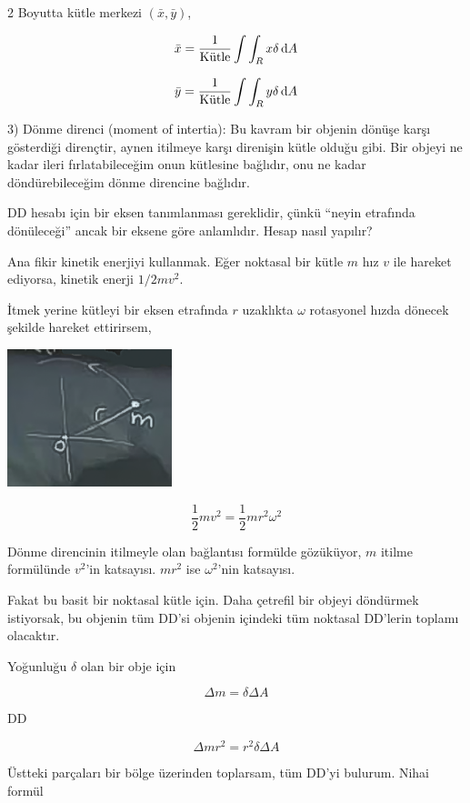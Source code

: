 \documentclass[12pt,fleqn]{article}\usepackage{../../common}
\begin{document}
2 Boyutta kütle merkezi $(\bar{x},\bar{y})$, 

$$  \bar{x}  = \frac{1}{\textrm{Kütle}} \int \int_R x \delta \,\mathrm{d} A  $$

$$  \bar{y}  = \frac{1}{\textrm{Kütle}} \int \int_R y \delta \,\mathrm{d} A  $$

3) Dönme direnci (moment of intertia): Bu kavram bir objenin dönüşe
karşı gösterdiği dirençtir, aynen itilmeye karşı direnişin kütle olduğu
gibi. Bir objeyi ne kadar ileri fırlatabileceğim onun kütlesine bağlıdır,
onu ne kadar döndürebileceğim dönme direncine bağlıdır. 

DD hesabı için bir eksen tanımlanması gereklidir, çünkü ``neyin etrafında
dönüleceği'' ancak bir eksene göre anlamlıdır. Hesap nasıl yapılır? 

Ana fikir kinetik enerjiyi kullanmak. Eğer noktasal bir kütle $m$ hız $v$
ile hareket ediyorsa, kinetik enerji $1/2 mv^2$. 

İtmek yerine kütleyi bir eksen etrafında $r$ uzaklıkta $\omega$ rotasyonel
hızda dönecek şekilde hareket ettirirsem,

\begin{center}
\includegraphics[height=4cm]{17_4.png}
\end{center}

$$ \frac{1}{2}mv^2 = \frac{1}{2}mr^2\omega^2  $$

Dönme direncinin itilmeyle olan bağlantısı formülde gözüküyor, $m$ itilme
formülünde $v^2$'in katsayısı. $mr^2$ ise $\omega^2$'nin katsayısı.

Fakat bu basit bir noktasal kütle için. Daha çetrefil bir objeyi döndürmek
istiyorsak, bu objenin tüm DD'si objenin içindeki tüm noktasal DD'lerin
toplamı olacaktır. 

Yoğunluğu $\delta$ olan bir obje için 

$$ \Delta m = \delta \Delta A $$

DD

$$ \Delta m r^2 = r^2 \delta \Delta A $$

Üstteki parçaları bir bölge üzerinden toplarsam, tüm DD'yi bulurum. Nihai
formül
\end{document}
